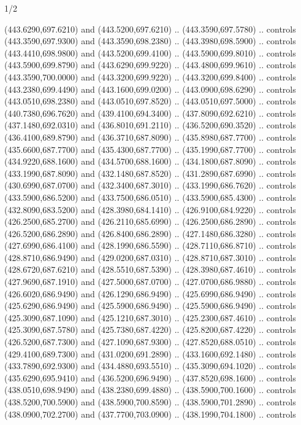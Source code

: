 \begin{flagdescription}{1/2}
\begin{scope}[xshift=0.5\flaglength]
\begin{scope}[scale=0.00745\flagwidth,xshift=-12.1mm,yshift=41.7mm]
\begin{scope}[y=0.80pt, x=0.80pt, yscale=-1, xscale=1, inner sep=0pt, outer sep=0pt]
\begin{scope}[cm={{1.33333,0.0,0.0,-1.33333,(0.0,114.66667)}}]
\begin{scope}[scale=0.100]
  (443.6290,697.6210) and (443.5200,697.6210) .. (443.3590,697.5780) .. controls
  (443.3590,697.9300) and (443.3590,698.2380) .. (443.3980,698.5900) .. controls
  (443.4410,698.9800) and (443.5200,699.4100) .. (443.5900,699.8010) .. controls
  (443.5900,699.8790) and (443.6290,699.9220) .. (443.4800,699.9610) .. controls
  (443.3590,700.0000) and (443.3200,699.9220) .. (443.3200,699.8400) .. controls
  (443.2380,699.4490) and (443.1600,699.0200) .. (443.0900,698.6290) .. controls
  (443.0510,698.2380) and (443.0510,697.8520) .. (443.0510,697.5000) .. controls
  (440.7380,696.7620) and (439.4100,694.3400) .. (437.8090,692.6210) .. controls
  (437.1480,692.0310) and (436.8010,691.2110) .. (436.5200,690.3520) .. controls
  (436.4100,689.8790) and (436.3710,687.8090) .. (435.8980,687.7700) .. controls
  (435.6600,687.7700) and (435.4300,687.7700) .. (435.1990,687.7700) .. controls
  (434.9220,688.1600) and (434.5700,688.1600) .. (434.1800,687.8090) .. controls
  (433.1990,687.8090) and (432.1480,687.8520) .. (431.2890,687.6990) .. controls
  (430.6990,687.0700) and (432.3400,687.3010) .. (433.1990,686.7620) .. controls
  (433.5900,686.5200) and (433.7500,686.0510) .. (433.5900,685.4300) .. controls
  (432.8090,683.5200) and (428.3980,684.1410) .. (426.9100,684.9220) .. controls
  (426.2500,685.2700) and (426.2110,685.6990) .. (426.2500,686.2890) .. controls
  (426.5200,686.2890) and (426.8400,686.2890) .. (427.1480,686.3280) .. controls
  (427.6990,686.4100) and (428.1990,686.5590) .. (428.7110,686.8710) .. controls
  (428.8710,686.9490) and (429.0200,687.0310) .. (428.8710,687.3010) .. controls
  (428.6720,687.6210) and (428.5510,687.5390) .. (428.3980,687.4610) .. controls
  (427.9690,687.1910) and (427.5000,687.0700) .. (427.0700,686.9880) .. controls
  (426.6020,686.9490) and (426.1290,686.9490) .. (425.6990,686.9490) .. controls
  (425.6290,686.9490) and (425.5900,686.9490) .. (425.5900,686.9490) .. controls
  (425.3090,687.1090) and (425.1210,687.3010) .. (425.2300,687.4610) .. controls
  (425.3090,687.5780) and (425.7380,687.4220) .. (425.8200,687.4220) .. controls
  (426.5200,687.7300) and (427.1090,687.9300) .. (427.8520,688.0510) .. controls
  (429.4100,689.7300) and (431.0200,691.2890) .. (433.1600,692.1480) .. controls
  (433.7890,692.9300) and (434.4880,693.5510) .. (435.3090,694.1020) .. controls
  (435.6290,695.9410) and (436.5200,696.9490) .. (437.8520,698.1600) .. controls
  (438.0510,698.9490) and (438.2380,699.4880) .. (438.5900,700.1600) .. controls
  (438.5200,700.5900) and (438.5900,700.8590) .. (438.5900,701.2890) .. controls
  (438.0900,702.2700) and (437.7700,703.0900) .. (438.1990,704.1800) .. controls

\end{scope}
\end{scope}
\end{scope}
\end{scope}
\end{scope}
\end{flagdescription}

